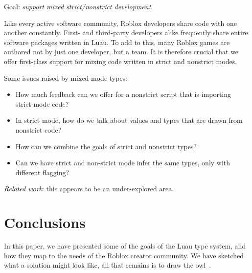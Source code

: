 \documentclass[acmsmall]{acmart}
\begin{document}
Goal: \emph{support mixed strict/nonstrict development}.

Like every active software community, Roblox developers share code
with one another constantly.  First- and third-party developers alike
frequently share entire software packages written in Luau.  To add to
this, many Roblox games are authored not by just one developer, but a
team.
It is therefore crucial that we offer first-class support for mixing
code written in strict and nonstrict modes.

Some issues raised by mixed-mode types:
\begin{itemize}

\item How much feedback can we offer for a nonstrict script that is
  importing strict-mode code?

\item In strict mode, how do we talk about values and types that are
  drawn from nonstrict code?

\item How can we combine the goals of strict and nonstrict types?

\item Can we have strict and non-strict mode infer the same types,
  only with different flagging?

\end{itemize}
\emph{Related work}: this appears to be an under-explored area.

\section{Conclusions}

In this paper, we have presented some of the goals of the Luau type
system, and how they map to the needs of the Roblox creator
community. We have sketched what a solution might look like, all that
remains is to draw the owl~\cite{HowToDrawAnOwl}.

 
\end{document}
